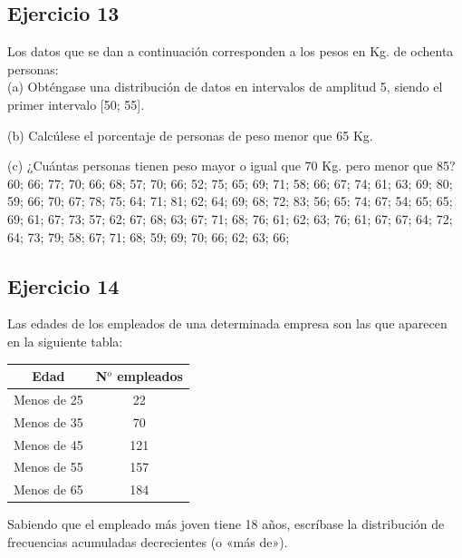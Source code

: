 \documentclass[11pt,letterpaper]{report}
\begin{document}
      \subsection*{Ejercicio 13}
        Los datos que se dan a continuación corresponden a los pesos en Kg. de ochenta personas:\\

        (a) Obténgase una distribución de datos en intervalos de amplitud 5, siendo el primer intervalo [50; 55].

        (b) Calcúlese el porcentaje de personas de peso menor que 65 Kg.

        (c) ¿Cuántas personas tienen peso mayor o igual que 70 Kg. pero menor que 85? \\

        60; 66; 77; 70; 66; 68; 57; 70; 66; 52; 75; 65; 69; 71; 58; 66; 67; 74; 61; 63; 69; 80; 59; 66; 70; 67; 78; 75; 64; 71; 81; 62; 64; 69; 68; 72; 83; 56; 65; 74; 67; 54; 65; 65; 69; 61; 67; 73; 57; 62; 67; 68; 63; 67; 71; 68; 76;
        61; 62; 63; 76; 61; 67; 67; 64; 72; 64; 73; 79; 58; 67; 71; 68; 59; 69; 70; 66; 62; 63; 66;
      \subsection*{Ejercicio 14}
        Las edades de los empleados de una determinada empresa son las que aparecen en la siguiente tabla:

        \begin{table}[!h]
          \centering
          \begin{tabular}{|c|c|}
              \hline
              Edad & N$^o$ empleados   \\
              \hline
              Menos de 25 & 22 \\
              Menos de 35 & 70 \\
              Menos de 45 & 121\\
              Menos de 55 & 157\\
              Menos de 65 & 184\\
              \hline
          \end{tabular}
        \end{table}

        Sabiendo que el empleado más joven tiene 18 años, escríbase la distribución de frecuencias acumuladas decrecientes (o «más de»).
\end{document}
